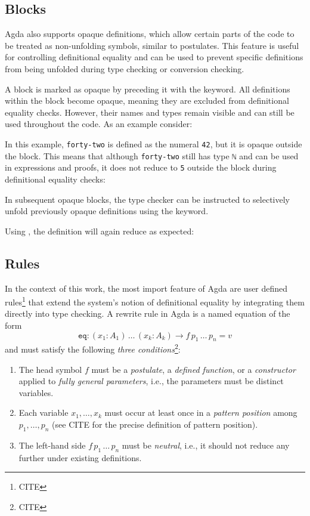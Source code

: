\documentclass[screen,nonacm]{acmart}
\begin{document}
\subsection*{ Blocks}

Agda also supports opaque definitions, which allow certain parts of the code to
be treated as non-unfolding symbols, similar to postulates. This feature is
useful for controlling definitional equality and can be used to prevent
specific definitions from being unfolded during type checking or conversion
checking.

A block is marked as opaque by preceding it with the 
keyword. All definitions within the block become opaque, meaning they are
excluded from definitional equality checks. However, their names and types
remain visible and can still be used throughout the code. As an example
consider: \EOpaque{}

In this example, \verb|forty-two| is defined as the numeral \verb|42|, but it
is opaque outside the block. This means that although \verb|forty-two| still
has type \verb|ℕ| and can be used in expressions and proofs, it does not reduce
to \verb|5| outside the block during definitional equality checks: \EOpaqueExO

In subsequent opaque blocks, the type checker can be instructed to selectively
unfold previously opaque definitions using the  keyword.

Using , the definition will again reduce as expected:
\EOpaqueExT{}

\subsection*{ Rules}

In the context of this work, the most import feature of Agda are user defined
 rules\footnote{CITE} that extend the system’s notion of
definitional equality by integrating them directly into type checking. A
rewrite rule in Agda is a named equation of the form
\[
      \texttt{eq} : (x_1 : A_1)\, \ldots\, (x_k : A_k) \to f\, p_1\, \ldots\, p_n = v
\]
and must satisfy the following \emph{three conditions}\footnote{CITE}:
\begin{enumerate}
      \item The head symbol $f$ must be a \emph{postulate}, a \emph{defined function}, or a
            \emph{constructor} applied to \emph{fully general parameters}, i.e., the
            parameters must be distinct variables.
      \item Each variable $x_1, \ldots, x_k$ must occur at least once in a \emph{pattern
                  position} among $p_1, \ldots, p_n$ (see CITE for the precise definition of
            pattern position).
      \item The left-hand side $f\, p_1\, \ldots\, p_n$ must be \emph{neutral}, i.e., it
            should not reduce any further under existing definitions.
\end{enumerate}
\end{document}
